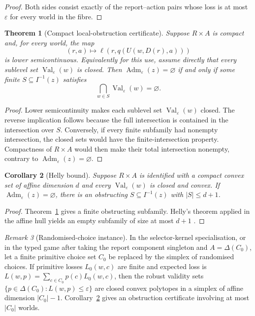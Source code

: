 \documentclass[11pt]{article}
\theoremstyle{plain}
\newtheorem{theorem}{Theorem}[section]
\newtheorem{corollary}[theorem]{Corollary}
\theoremstyle{definition}
\theoremstyle{remark}
\newtheorem{remark}[theorem]{Remark}
\newcommand{\Adm}{\operatorname{Adm}}
\newcommand{\eps}{\varepsilon}
\begin{document}
\begin{proof}
Both sides consist exactly of the report--action pairs whose loss is at most
$\eps$ for every world in the fibre.
\end{proof}

\begin{theorem}[Compact local-obstruction certificate]\label{thm:compact-obstruction}
Suppose $R\times A$ is compact and, for every world, the map
\[
(r,a)\longmapsto\ell(r,q(U(w,D(r),a)))
\]
is lower semicontinuous. Equivalently for this use, assume directly that every
sublevel set $\operatorname{Val}_\eps(w)$ is closed. Then
$\Adm_\eps(z)=\varnothing$ if and only if some finite
$S\subseteq I^{-1}(z)$ satisfies
\[
\bigcap_{w\in S}\operatorname{Val}_\eps(w)=\varnothing.
\]
\end{theorem}

\begin{proof}
Lower semicontinuity makes each sublevel set
$\operatorname{Val}_\eps(w)$ closed. The reverse implication follows because
the full intersection is contained in the intersection over $S$. Conversely, if
every finite subfamily had nonempty
intersection, the closed sets would have the finite-intersection property.
Compactness of $R\times A$ would then make their total intersection nonempty,
contrary to $\Adm_\eps(z)=\varnothing$.
\end{proof}

\begin{corollary}[Helly bound]\label{cor:helly}
Suppose $R\times A$ is identified with a compact convex set of affine dimension
$d$ and every $\operatorname{Val}_\eps(w)$ is closed and convex. If
$\Adm_\eps(z)=\varnothing$, there is an obstructing
$S\subseteq I^{-1}(z)$ with $|S|\le d+1$.
\end{corollary}

\begin{proof}
Theorem~\ref{thm:compact-obstruction} gives a finite obstructing subfamily.
Helly's theorem applied in the affine hull yields an empty subfamily of size at
most $d+1$ \cite{eckhoff}.
\end{proof}

\begin{remark}[Randomised-choice instance]
In the selector-kernel specialisation, or in the typed game after taking the
report component singleton and $A=\Delta(C_0)$, let a finite primitive choice
set $C_0$ be replaced by the simplex of randomised choices. If primitive losses
$L_0(w,c)$ are finite and expected loss is
$L(w,p)=\sum_{c\in C_0}p(c)L_0(w,c)$, then the robust validity sets
$\{p\in\Delta(C_0):L(w,p)\le\eps\}$ are closed convex polytopes in a
simplex of affine dimension $|C_0|-1$. Corollary~\ref{cor:helly} gives an
obstruction certificate involving at most $|C_0|$ worlds.
\end{remark}
\end{document}
